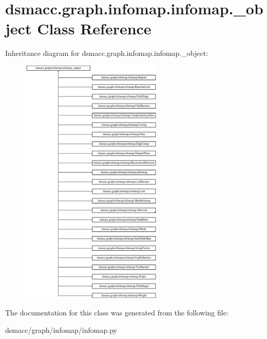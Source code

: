 \hypertarget{classdsmacc_1_1graph_1_1infomap_1_1infomap_1_1__object}{}\section{dsmacc.\+graph.\+infomap.\+infomap.\+\_\+object Class Reference}
\label{classdsmacc_1_1graph_1_1infomap_1_1infomap_1_1__object}
Inheritance diagram for dsmacc.\+graph.\+infomap.\+infomap.\+\_\+object\+:\begin{figure}[H]
\begin{center}
\leavevmode
\includegraphics[height=12.000000cm]{classdsmacc_1_1graph_1_1infomap_1_1infomap_1_1__object}
\end{center}
\end{figure}


The documentation for this class was generated from the following file\+:\begin{DoxyCompactItemize}
\item 
dsmacc/graph/infomap/infomap.\+py\end{DoxyCompactItemize}
